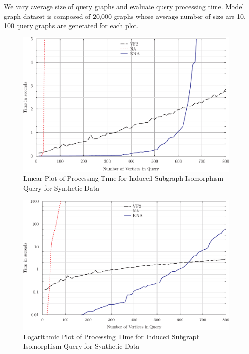We vary average size of query graphs and evaluate query processing time.
Model graph dataset is composed of 20,000 graphs whose average number of size are 10.
100 query graphs are generated for each plot.
%
\begin{figure}[h]
\centering
\centerline{\includegraphics{images/kna_inducedS}}
\caption{Linear Plot of Processing Time for Induced Subgraph Isomorphism Query for Synthetic Data}
\label{fig:fig5}
\end{figure}

\begin{figure}[h]
\centering
\centerline{\includegraphics{images/kna_induced_logS}}
\caption{Logarithmic Plot of Processing Time for Induced Subgraph Isomorphism Query for Synthetic Data}
\label{fig:fig6}
\end{figure}


